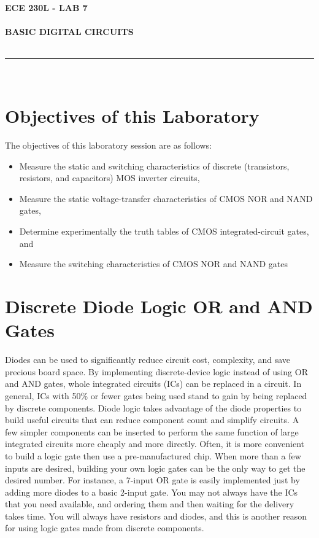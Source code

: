 \documentclass[12pt]{../manual}
\begin{document}
\begin{center}
\textbf{\huge ECE 230L - LAB 7}\\~\\
\textbf{\large BASIC DIGITAL CIRCUITS}\\~\\
\rule{6.5in}{0.5mm}\\
\end{center}

\tableofcontents

\listoffigures

\newpage
%
\section{Objectives of this Laboratory}
The objectives of this laboratory session are as follows:
\begin{itemize}
\item Measure the static and switching characteristics of discrete (transistors, resistors, and capacitors) MOS inverter circuits,
\item Measure the static voltage-transfer characteristics of CMOS NOR and NAND gates,
\item Determine experimentally the truth tables of CMOS integrated-circuit gates, and
\item Measure the switching characteristics of CMOS NOR and NAND gates
\end{itemize}

\section{Discrete Diode Logic OR and AND Gates}
Diodes can be used to significantly reduce circuit cost, complexity, and save precious board space. By implementing discrete-device logic instead of using OR and AND gates, whole integrated circuits (ICs) can be replaced in a circuit. In general, ICs with 50\% or fewer gates being used stand to gain by being replaced by discrete components. Diode logic takes advantage of the diode properties to build useful circuits that can reduce component count and simplify circuits. A few simpler components can be inserted to perform the same function of large integrated circuits more cheaply and more directly. Often, it is more convenient to build a logic gate then use a pre-manufactured chip. When more than a few inputs are desired, building your own logic gates can be the only way to get the desired number. For instance, a 7-input OR gate is easily implemented just by adding more diodes to a basic 2-input gate. You may not always have the ICs that you need available, and ordering them and then waiting for the delivery takes time. You will always have resistors and diodes, and this is another reason for using logic gates made from discrete components.
\end{document}
